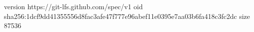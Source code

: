 version https://git-lfs.github.com/spec/v1
oid sha256:1dcf9dd41355556d8fac3afe47f777e96abef11e0395e7aa03b6fa418c3fc2dc
size 87536
